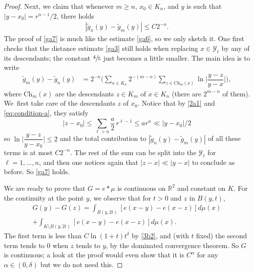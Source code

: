 \documentclass[10pt]{amsart}
\let\sm\setminus
\numberwithin{equation}{section}
\theoremstyle{plain}
\theoremstyle{definition}
\newcommand{\R}{\mathbb{R}}
\newcommand{\cY}{{\mathcal Y}}
\begin{document}
\begin{proof}
Next, we claim that whenever $ m \ge n$, $x_0 \in K_n$, and $y$ is such that $|y-x_0| = r^{n-1}/2$, there holds
\begin{align}
| \tilde{g}_n(y) - \tilde{g}_m(y) | \le C 2^{-n} \label{ga7}.
\end{align}
The proof of \eqref{ga7} is much like the estimate \eqref{ga6}, so we only sketch it.
One first checks that the distance estimate \eqref{ga3} still holds when replacing $x\in \cY_\ell$ by any of its descendants; the constant $\sfrac45$ just becomes a little smaller. The
main idea is to write
\begin{align*}
\tilde{g}_m(y) -\tilde{g}_n(y) & = 2^{-n} \biggl( \sum_{x \in K_n} 2^{-(m-n)} \sum_{z \in \mathrm{Ch}_m(x)}
\ln \Big |\dfrac{y-z}{y-x}\Big| \biggr),
\end{align*}
where $\mathrm{Ch}_m(x)$ are the descendants $z \in K_m$ of $x\in K_n$ (there are $2^{m-n}$ of them).
We~first take care of the descendants $z$ of $x_0$. Notice that by \eqref{2a1}
and \eqref{eq:condition-a}, they satisfy
\[
|z-x_0| \leq \sum_{\ell > n} \frac{a}{2} \, r^{\ell -1} \leq a r^n \ll |y-x_0|/2
\]
so $\ln \big |\dfrac{y-z}{y-x_0}\big| \leq 2$ and the total contribution to $| \tilde{g}_n(y) - \tilde{g}_m(y)|$
of all these terms is at most $C 2^{-n}$.
The rest of the sum can be split into the $\cY_\ell$ for $\ell=1,\dots,n$, and then one notices again
that $|z-x| \ll |y-x|$ to conclude as before. So \eqref{ga7} holds.

We are ready to prove that $G = e \ast \mu$ is continuous on $\R^2$ and constant on $K$.
For the continuity at the point $y$, we observe that for $t > 0$ and $z$ in $B(y,t)$,
\begin{multline*}
G(y) - G(z) = \int_{B(y,2t)} [e(x-y) - e(x-z)] d\mu(x)
\\ + \int_{K \sm B(y,2t)} [e(x-y) - e(x-z)] d\mu(x).
\end{multline*}
The first term is less than $C \ln(1+t) t^\delta$ by \eqref{3b2}, and (with $t$ fixed) the
second term tends to $0$ when $z$ tends to $y$, by the dominated convergence theorem.
So $G$ is continuous; a look at the proof would even show that it is $C^\alpha$ for any
$\alpha \in (0,\delta)$ but we do not need this.


\end{proof}
\end{document}
